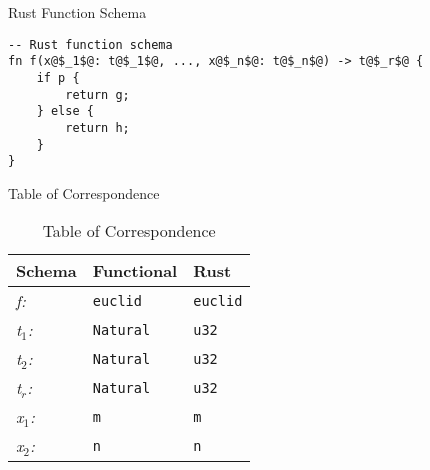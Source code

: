\documentclass[12pt,t]{beamer}
\begin{document}
\begin{frame}[fragile]{Rust Function Schema}
\begin{center}
\vfill
\begin{verbatim}
-- Rust function schema
fn f(x@$_1$@: t@$_1$@, ..., x@$_n$@: t@$_n$@) -> t@$_r$@ {
    if p {
        return g;
    } else {
        return h;
    }
}
\end{verbatim}
\vfill
\end{center}
\end{frame}

\begin{frame}{Table of Correspondence}
\begin{center}
\vfill
\begin{table}[h]
    \centering
    \renewcommand{\arraystretch}{1.5}
    \begin{tabular}{|l|l|l|}
        \hline
        \textbf{Schema}    & \textbf{Functional}                & \textbf{Rust}                            \\
        \hline
        \emph{f:}        & \texttt{euclid}                    & \texttt{euclid}                          \\
        \hline
        \emph{t$_1$:}       & \texttt{Natural}                   & \texttt{u32}                             \\
        \hline
        \emph{t$_2$:}       & \texttt{Natural}                   & \texttt{u32}                             \\
        \hline
        \emph{t$_r$:}       & \texttt{Natural}                   & \texttt{u32}                             \\
        \hline
        \emph{x$_1$:}       & \texttt{m}                         & \texttt{m}                               \\
        \hline
        \emph{x$_2$:}       & \texttt{n}                         & \texttt{n}                               \\
        \hline
    \end{tabular}
    \caption{Table of Correspondence}
\end{table}
\vfill
\end{center}
\end{frame}
\end{document}
